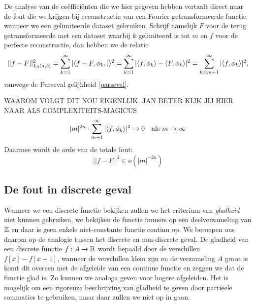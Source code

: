 De analyse van de co\"effici\"enten die we hier gegeven hebben vertaalt direct naar de fout die we krijgen
bij reconstructie van een Fourier-getransformeerde functie wanneer we een gelimiteerde dataset gebruiken.
Schrijf namelijk $F$ voor de terug getransformeerde met een dataset waarbij $k$ gelimiteerd is tot $m$ en $f$ voor
de perfecte reconstructie, dan hebben we de relatie
\[
  || f - F||^2_{L_2(a,b)} = \sum_{k=1}^\infty |\langle f-F,\phi_k , | \rangle^2 = \sum_{k=1}^\infty |\langle f , \phi_k \rangle 
  - \langle F , \phi_k \rangle|^2 = \sum_{k=m+1}^\infty |\langle f , \phi_k \rangle|^2,
\]
vanwege de Parseval gelijkheid \ref{parseval}.

WAAROM VOLGT DIT NOU EIGENLIJK, JAN BETER KIJK JIJ HIER NAAR ALS COMPLEXITEITS-MAGICUS
\[
|m|^{2n} \cdot \sum_{m+1}^\infty |\langle f , \phi_k \rangle|^2 \to 0 \quad \text{als } m\to\infty
\]
Daarmee wordt de orde van de totale fout:
\[
||f-F||^2 \in o\left ( |m|^{-2n} \right)
\]

\subsection{De fout in discrete geval}
Wanneer we een discrete functie bekijken zullen we het criterium van \emph{gladheid} niet kunnen gebruiken,
we bekijken de functie immers op een deelverzameling van $\mathbb{Z}$ en daar is geen enkele 
niet-constante functie continu op.
We beroepen ons daarom op de analogie tussen het discrete en non-discrete geval.
De gladheid van een discrete functie $f:A\to\mathbb{R}$ wordt bepaald door de verschillen $f[x]-f[x+1]$,
wanneer de verschillen klein zijn en de verzameling $A$ groot is komt dit overeen met de afgeleide van een 
continue functie en zeggen we dat de functie glad is. Zo kunnen we analoga geven voor hogere afgeleiden.
Het is mogelijk om een rigoreuze beschrijving van gladheid te geven door parti\"eele sommaties te gebruiken,
maar daar zullen we niet op in gaan.

